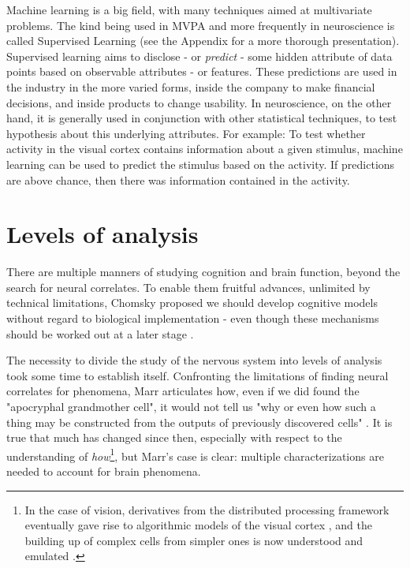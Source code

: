         Machine learning is a big field, with many techniques aimed at multivariate problems. The kind being used in MVPA and more frequently in neuroscience is called Supervised Learning (see the Appendix for a more thorough presentation). Supervised learning aims to disclose - or \textit{predict} - some hidden attribute of data points based on observable attributes - or features. These predictions are used in the industry in the more varied forms, inside the company to make financial decisions, and inside products to change usability. In neuroscience, on the other hand, it is generally used in conjunction with other statistical techniques, to test hypothesis about this underlying attributes. For example: To test whether activity in the visual cortex contains information about a given stimulus, machine learning can be used to predict the stimulus based on the activity. If predictions are above chance, then there was information contained in the activity.
        

\section{Levels of analysis}
    There are multiple manners of studying cognition and brain function, beyond the search for neural correlates. To enable them fruitful advances, unlimited by technical limitations, Chomsky proposed we should develop cognitive models without regard to biological implementation - even though these mechanisms should be worked out at a later stage \cite[p.~12]{chomsky2006language}.

    The necessity to divide the study of the nervous system into levels of analysis took some time to establish itself. Confronting the limitations of finding neural correlates for phenomena, Marr articulates how, even if we did found the "apocryphal grandmother cell", it would not tell us "why or even how such a thing may be constructed from the outputs of previously discovered cells" \cite[p~15]{marr1982vision}. It is true that much has changed since then, especially with respect to the understanding of \textit{how}\footnote{In the case of vision, derivatives from the distributed processing framework eventually gave rise to algorithmic models of the visual cortex \cite{fukushima1980neocognitron}, and the building up of complex cells from simpler ones is now understood and emulated \cite[p~??]{goodfellow2016deep}.}, but Marr's case is clear: multiple characterizations are needed to account for brain phenomena. 
    

